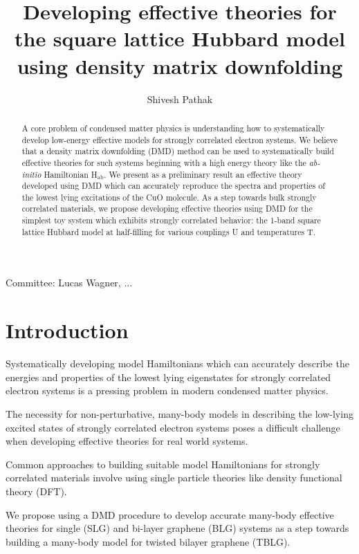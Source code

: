 \documentclass[12pt]{article}
\author{Shivesh Pathak}
\title{Developing effective theories for the square lattice Hubbard model using density matrix downfolding}
\begin{document}
\maketitle
\begin{abstract}
A core problem of condensed matter physics is understanding how to systematically develop low-energy effective models for strongly correlated electron systems. 
We believe that a density matrix downfolding (DMD) method can be used to systematically build effective theories for such systems beginning with a high energy theory like the \textit{ab-initio} Hamiltonian H$_\text{ab}$.
We present as a preliminary result an effective theory developed using DMD which can accurately reproduce the spectra and properties of the lowest lying excitations of the CuO molecule.
As a step towards bulk strongly correlated materials, we propose developing effective theories using DMD for the simplest toy system which exhibits strongly correlated behavior: the 1-band square lattice Hubbard model at half-filling for various couplings U and temperatures T.
\end{abstract}
Committee: Lucas Wagner, ...
\pagebreak

\section{Introduction}
Systematically developing model Hamiltonians which can accurately describe the energies and properties of the lowest lying eigenstates for strongly correlated electron systems is a pressing problem in modern condensed matter physics. 

The necessity for non-perturbative, many-body models in describing the low-lying excited states of strongly correlated electron systems poses a difficult challenge when developing effective theories for real world systems.

Common approaches to building suitable model Hamiltonians for strongly correlated materials involve using single particle theories like density functional theory (DFT).

We propose using a DMD procedure to develop accurate many-body effective theories for single (SLG) and bi-layer graphene (BLG) systems as a step towards building a many-body model for twisted bilayer graphene (TBLG).
\end{document}
